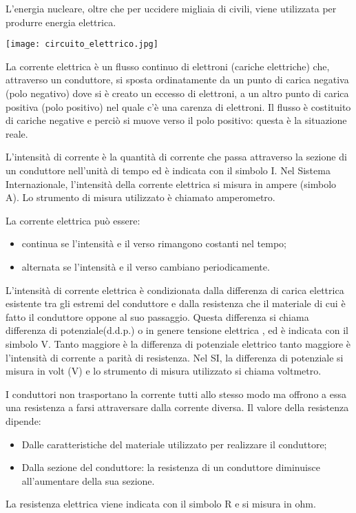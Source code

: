 L’energia nucleare, oltre che per uccidere migliaia di civili, viene utilizzata per produrre energia elettrica.

\noindent
\texttt{[image: circuito\_elettrico.jpg]}

La corrente elettrica è un flusso continuo di elettroni (cariche elettriche) che, attraverso un conduttore, si sposta ordinatamente da un punto di carica negativa (polo negativo) dove si è creato un eccesso di elettroni, a un altro punto di carica positiva (polo positivo) nel quale c’è una carenza di elettroni. Il flusso è costituito di cariche negative e perciò si muove verso il polo positivo: questa è la situazione reale.

L’intensità di corrente è la quantità di corrente che passa attraverso la sezione di un conduttore nell’unità di tempo ed è indicata con il simbolo I. Nel Sistema Internazionale, l’intensità della corrente elettrica si misura in ampere (simbolo A). Lo strumento di misura utilizzato è chiamato amperometro.

La corrente elettrica può essere:
\begin{itemize}
  \item continua se l’intensità e il verso rimangono costanti nel tempo;
  \item alternata se l’intensità e il verso cambiano periodicamente.
\end{itemize}

L’intensità di corrente elettrica è condizionata dalla differenza di carica elettrica esistente tra gli estremi del conduttore e dalla resistenza che il materiale di cui è fatto il conduttore oppone al suo passaggio. Questa differenza si chiama differenza di potenziale(d.d.p.) o in genere tensione elettrica , ed è indicata con il simbolo V. Tanto maggiore è la differenza di potenziale elettrico tanto maggiore è l’intensità di corrente a parità di resistenza. Nel SI, la differenza di potenziale si misura in volt (V) e lo strumento di misura utilizzato si chiama voltmetro.

I conduttori non trasportano la corrente tutti allo stesso modo ma offrono a essa una resistenza a farsi attraversare dalla corrente diversa. Il valore della resistenza dipende:
\begin{itemize}
  \item Dalle caratteristiche del materiale utilizzato per realizzare il conduttore;
  \item Dalla sezione del conduttore: la resistenza di un conduttore diminuisce all’aumentare della sua sezione.
\end{itemize}
La resistenza elettrica viene indicata con il simbolo R e si misura in ohm.
